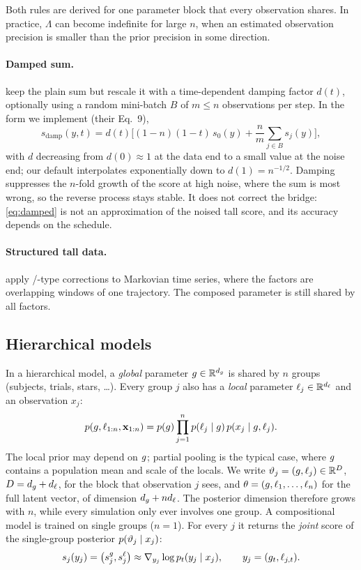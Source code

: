 Both rules are derived for one parameter block that every observation shares.
In practice, $\Lambda$ can become indefinite for large $n$, when an estimated observation precision is smaller than the prior precision in some direction.

\paragraph{Damped sum.}
\citet{arruda2025compositional} keep the plain sum but rescale it with a time-dependent damping factor $d(t)$, optionally using a random mini-batch $B$ of $m\le n$ observations per step.
In the form we implement (their Eq.~9),
\begin{equation}\label{eq:damped}
  s_\mathrm{damp}(y,t)=d(t)\Big[(1-n)(1-t)\,s_0(y)+\frac{n}{m}\sum_{j\in B}s_j(y)\Big],
\end{equation}
with $d$ decreasing from $d(0)\approx1$ at the data end to a small value at the noise end; our default interpolates exponentially down to $d(1)=n^{-1/2}$.
Damping suppresses the $n$-fold growth of the score at high noise, where the sum is most wrong, so the reverse process stays stable.
It does not correct the bridge: \cref{eq:damped} is not an approximation of the noised tall score, and its accuracy depends on the schedule.

\paragraph{Structured tall data.}
\citet{gloeckler2025compositional} apply \gauss/\jac-type corrections to Markovian time series, where the factors are overlapping windows of one trajectory.
The composed parameter is still shared by all factors.

\subsection{Hierarchical models}\label{sec:bg-hier}

In a hierarchical model, a \emph{global} parameter $g\in\mathbb{R}^{d_g}$ is shared by $n$ groups (subjects, trials, stars, \dots).
Every group $j$ also has a \emph{local} parameter $\ell_j\in\mathbb{R}^{d_\ell}$ and an observation $x_j$:
\begin{equation}\label{eq:hier-model}
  p(g,\ell_{1:n},\mathbf{x}_{1:n})=p(g)\prod_{j=1}^{n}p(\ell_j\mid g)\,p(x_j\mid g,\ell_j).
\end{equation}
The local prior may depend on $g$; partial pooling is the typical case, where $g$ contains a population mean and scale of the locals.
We write $\vartheta_j=(g,\ell_j)\in\mathbb{R}^{D}$, $D=d_g+d_\ell$, for the block that observation $j$ sees, and $\theta=(g,\ell_1,\dots,\ell_n)$ for the full latent vector, of dimension $d_g+nd_\ell$.
The posterior dimension therefore grows with $n$, while every simulation only ever involves one group.
A compositional model is trained on single groups ($n=1$).
For every $j$ it returns the \emph{joint} score of the single-group posterior $p(\vartheta_j\mid x_j)$:
\begin{equation}\label{eq:row-score}
  s_j(y_j)=\big(s_j^{g},s_j^{\ell}\big)\approx\nabla_{y_j}\log p_t(y_j\mid x_j),\qquad y_j=(g_t,\ell_{j,t}).
\end{equation}

